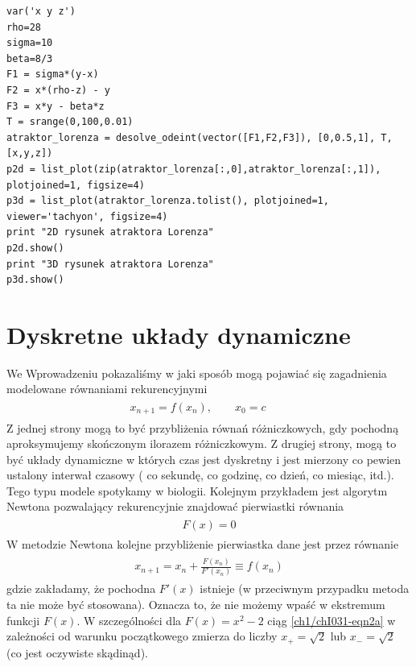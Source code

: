 \documentclass[a4paper,12pt,polish]{sphinxmanual}
\begin{document}
\begin{verbatim}
var('x y z')
rho=28
sigma=10
beta=8/3
F1 = sigma*(y-x)
F2 = x*(rho-z) - y
F3 = x*y - beta*z
T = srange(0,100,0.01)
atraktor_lorenza = desolve_odeint(vector([F1,F2,F3]), [0,0.5,1], T, [x,y,z])
p2d = list_plot(zip(atraktor_lorenza[:,0],atraktor_lorenza[:,1]), plotjoined=1, figsize=4)
p3d = list_plot(atraktor_lorenza.tolist(), plotjoined=1, viewer='tachyon', figsize=4)
print "2D rysunek atraktora Lorenza"
p2d.show()
print "3D rysunek atraktora Lorenza"
p3d.show()
\end{verbatim}



\section{Dyskretne układy dynamiczne}
\label{ch1/chI031:dyskretne-uklady-dynamiczne}\label{ch1/chI031::doc}
We Wprowadzeniu pokazaliśmy w jaki sposób mogą pojawiać się zagadnienia modelowane równaniami rekurencyjnymi
\label{ch1/chI031:equation-eqn1}\begin{gather}
\begin{split}x_{n+1} = f(x_n), \quad \quad x_0 = c\qquad\end{split}\label{ch1/chI031-eqn1}
\end{gather}
Z jednej strony mogą to być przybliżenia  równań różniczkowych, gdy pochodną aproksymujemy  skończonym ilorazem różniczkowym. Z drugiej strony, mogą to być układy dynamiczne w których czas jest  dyskretny i jest mierzony co pewien ustalony interwał czasowy ( co sekundę, co godzinę, co dzień, co miesiąc, itd.). Tego typu modele spotykamy w biologii. Kolejnym przykładem jest algorytm Newtona pozwalający rekurencyjnie znajdować pierwiastki równania
\label{ch1/chI031:equation-eqn2}\begin{gather}
\begin{split}F(x) = 0\end{split}\label{ch1/chI031-eqn2}
\end{gather}
W metodzie  Newtona  kolejne przybliżenie pierwiastka dane jest przez równanie
\label{ch1/chI031:equation-eqn2a}\begin{gather}
\begin{split}x_{n+1} = x_n + \frac{F(x_n)}{F'(x_n)}\equiv f(x_n)\end{split}\label{ch1/chI031-eqn2a}
\end{gather}
gdzie zakładamy, że pochodna $F'(x)$ istnieje (w przeciwnym przypadku metoda ta nie może być stosowana). Oznacza to, że nie możemy wpaść w ekstremum funkcji $F(x)$.  W szczególności dla $F(x)=x^2-2$ ciąg \eqref{ch1/chI031-eqn2a} w zależności od warunku początkowego zmierza do liczby $x_{+}=\sqrt{2}$ lub $x_{-}=\sqrt{2}$  (co jest oczywiste skądinąd).
\end{document}
